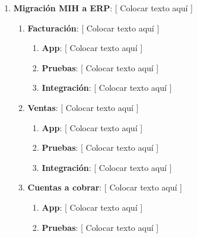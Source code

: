 \documentclass{article}
\begin{document}
	\begin{enumerate}
		\itemsep=3pt \topsep=0pt \partopsep=0pt \parskip=0pt \parsep=0pt
		
		\item \textbf{Migración MIH a ERP}: [ Colocar texto aquí ]

			\begin{enumerate}[label*=\arabic*.]

				\item \textbf{Facturación}: [ Colocar texto aquí ]

					\begin{enumerate}[label*=\arabic*.]
						\itemsep=3pt \topsep=0pt \partopsep=0pt \parskip=0pt \parsep=0pt

						\item \textbf{App}: [ Colocar texto aquí ]

						\item \textbf{Pruebas}: [ Colocar texto aquí ]

						\item \textbf{Integración}: [ Colocar texto aquí ]

					\end{enumerate}
			
				\item \textbf{Ventas}: [ Colocar texto aquí ]

					\begin{enumerate}[label*=\arabic*.]
						\itemsep=3pt \topsep=0pt \partopsep=0pt \parskip=0pt \parsep=0pt

						\item \textbf{App}: [ Colocar texto aquí ]

						\item \textbf{Pruebas}: [ Colocar texto aquí ]

						\item \textbf{Integración}: [ Colocar texto aquí ]

					\end{enumerate}

				\item \textbf{Cuentas a cobrar}: [ Colocar texto aquí ]

					\begin{enumerate}[label*=\arabic*.]
						\itemsep=3pt \topsep=0pt \partopsep=0pt \parskip=0pt \parsep=0pt

						\item \textbf{App}: [ Colocar texto aquí ]

						\item \textbf{Pruebas}: [ Colocar texto aquí ]


\end{enumerate}
\end{enumerate}
\end{enumerate}
\end{document}
